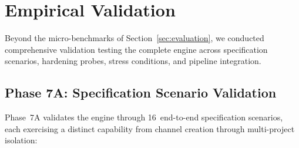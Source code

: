 \documentclass[10pt, twocolumn]{article}
\begin{document}
\section{Empirical Validation}
\label{sec:validation}

Beyond the micro-benchmarks of Section~\ref{sec:evaluation}, we conducted comprehensive validation testing the complete engine across specification scenarios, hardening probes, stress conditions, and pipeline integration.

\subsection{Phase 7A: Specification Scenario Validation}
\label{sec:phase7a}

Phase~7A validates the engine through 16~end-to-end specification scenarios, each exercising a distinct capability from channel creation through multi-project isolation:
\end{document}
